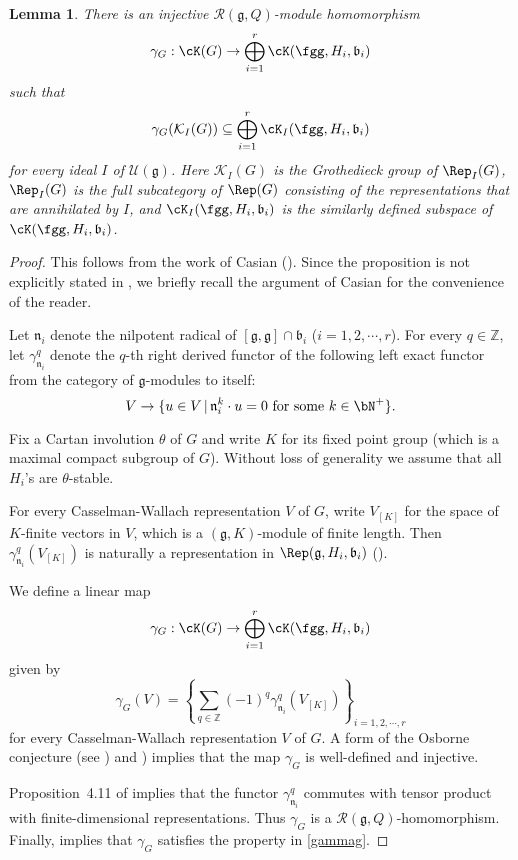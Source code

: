 \documentclass[12pt]{amsart}
\def\subset{\subseteq}
\newcommand{\CK}{{\mathcal {K}}}
\newcommand{\CU}{{\mathcal {U}}}
\newcommand{\g}{\mathfrak g}
\renewcommand{\b}{\mathfrak b}
\newcommand{\n}{\mathfrak n}
\newcommand{\Z}{\mathbb{Z}}
\newcommand{\be}{\begin {equation}}
\newcommand{\ee}{\end {equation}}
\numberwithin{equation}{section}
\newtheorem{lem}[thm]{Lemma}
\theoremstyle{remark}
\newcommand{\Grt}{\cK}
\begin{document}
 \begin{lem}\label{cor:HC.embed}
 There is an injective $\mathcal R(\g, Q)$-module homomorphism
 \[
\gamma_{G}: \Grt(G)\rightarrow  \bigoplus_{i=1}^{r} \Grt(\fgg,H_{i},\b_{i})
 \]
 such that
 \be\label{gammag}
   \gamma_{G}(\CK_I(G))\subset  \bigoplus_{i=1}^{r} \Grt_{I}(\fgg,H_{i},\b_{i})
 \ee
 for every ideal $I$ of $\CU(\g)$.
 Here $\CK_I(G)$ is the Grothedieck group of $\Rep_I(G)$,  $\Rep_I(G)$ is the full subcategory of $\Rep(G)$ consisting of the representations that are annihilated by  $I$, and $\Grt_{I}(\fgg,H_{i},\b_{i})$ is the similarly defined subspace of $\Grt(\fgg,H_{i},\b_{i})$.
 \end{lem}
\begin{proof}
This follows from the work of Casian (\cite{Cas}).
Since the proposition is not explicitly stated in \cite{Cas},
we briefly recall the argument of Casian for the convenience of the reader.



 Let $\n_i$ denote the nilpotent radical of $[\g,\g]\cap \b_i$ ($i=1,2, \cdots,r$).
 For every $q\in \Z$, let $\gamma_{\n_i}^q$ denote the $q$-th right derived functor of the following left exact functor from the category of $\g$-modules to itself:
 \[
   V\rightarrow \{u\in V\,|\, \n_i^k \cdot u=0\textrm{ for some $k\in \bN^+$}\}.
 \]

Fix a Cartan involution $\theta$ of $G$ and write $K$ for its fixed point group (which is a maximal compact subgroup of $G$).  Without loss of generality we assume that all $H_i$'s are $\theta$-stable.

For every Casselman-Wallach representation $V$ of $G$, write $V_{[K]}$ for the space of $K$-finite vectors in $V$, which is a $(\g,K)$-module of finite length. Then   $\gamma_{\n_i}^q(V_{[K]})$ is naturally a representation in $\Rep(\g, H_i, \b_i)$ (\cite[Corollary 4.9]{Cas}).

We define a linear map
 \[
\gamma_{G}: \Grt(G)\rightarrow  \bigoplus_{i=1}^{r} \Grt(\fgg,H_{i},\b_{i})
 \]
 given by
 \[
   \gamma_{G}(V)= \left\{\sum_{q\in \Z} (-1)^{q} \gamma^{q}_{\n_i}(V_{[K]})\right\}_{i=1,2, \cdots, r}
 \]
for every Casselman-Wallach representation $V$ of $G$. A form of the Osborne conjecture
(see \cite[Theorem 3.1]{Cas}) and \cite[Corollary 4.9]{Cas}) implies that the map $\gamma_{G}$ is well-defined and injective.

Proposition~4.11 of \cite{Cas} implies that the functor $\gamma_{\n_i}^q$ commutes with tensor product with finite-dimensional representations. Thus $\gamma_{G}$ is a $\mathcal R(\g, Q)$-homomorphism. Finally, \cite[Corollary 4.15]{Cas} implies that $\gamma_{G}$ satisfies the property in \eqref{gammag}.
\end{proof}
\end{document}
